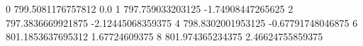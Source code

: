 0 799.5081176757812 0.0
1 797.759033203125 -1.74908447265625
2 797.3836669921875 -2.12445068359375
4 798.8302001953125 -0.67791748046875
6 801.1853637695312 1.67724609375
8 801.974365234375 2.46624755859375
